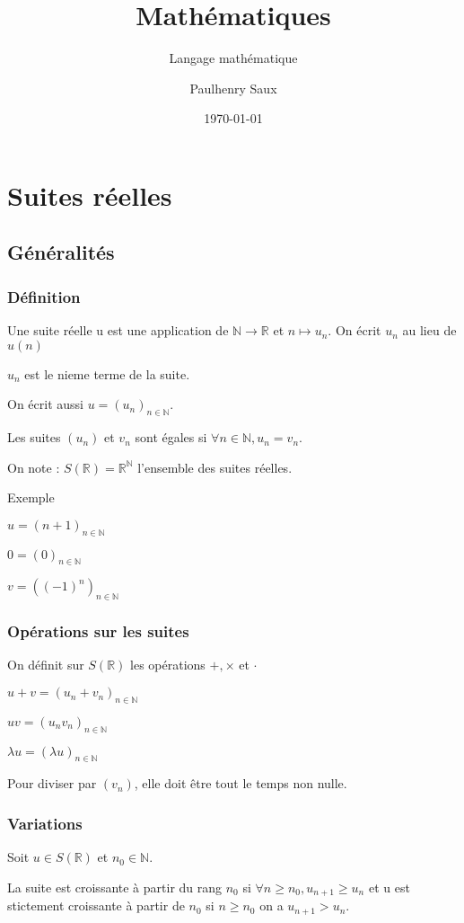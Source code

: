 \documentclass[french]{yLectureNote}
\title{Mathématiques}
\subtitle{Langage mathématique}
\author{Paulhenry Saux}
\date{\today}
\begin{document}
\setcounter{chapter}{1}

	\chapter{Suites réelles }
\section{Généralités}
\subsection{Définition}
Une suite réelle u est une application de $\mathbb{N} \rightarrow \mathbb{R}$ et $n \longmapsto u_n$. On écrit $u_n$ au lieu de $u(n)$

$u_n$ est le nieme terme de la suite.

On écrit aussi $u = (u_n)_{n\in\mathbb{N}}$.

Les suites $(u_n)$ et $v_n$ sont égales si $\forall n\in \mathbb{N}, u_n = v_n$.

On note :
$S(\mathbb{R}) = \mathbb{R}^{\mathbb{N}}$ l'ensemble des suites réelles.

Exemple

$u = (n+1)_{n\in\mathbb{N}}$

$0 = (0)_{n\in\mathbb{N}}$

$v = ((-1)^n)_{n\in\mathbb{N}}$

\subsection{Opérations sur les suites}
On définit sur $S(\mathbb{R})$ les opérations $+,\times$ et $\cdot$

$u+v = (u_n+v_n)_{n\in\mathbb{N}}$

$uv = (u_nv_n)_{n\in\mathbb{N}}$

$\lambda u = (\lambda u)_{n\in\mathbb{N}}$

Pour diviser par $(v_n)$, elle doit \^etre tout le temps non nulle.

\subsection{Variations}
Soit $u\in S(\mathbb{R})$ et $n_0 \in \mathbb{N}$.

\begin{theorem}
La suite est croissante à partir du rang $n_0$ si $\forall n\geq n_0, u_{n+1} \geq u_n$ et u est stictement croissante à partir de $n_0$ si $n\geq n_0$ on a $u_{n+1} > u_n$.
\end{theorem}
\end{document}
